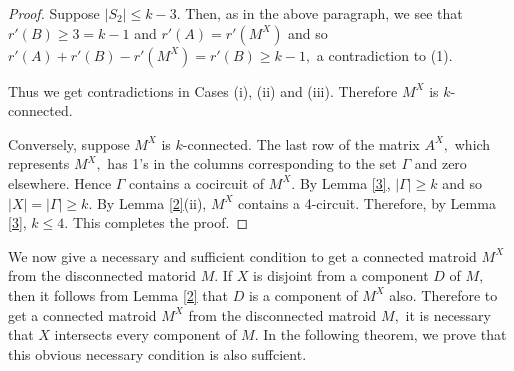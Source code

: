 \documentclass[
11pt,%
tightenlines,%
twoside,%
onecolumn,%
nofloats,%
nobibnotes,%
nofootinbib,%
superscriptaddress,%
noshowpacs,%
centertags]%
{revtex4}
\begin{document}
\begin{proof}
Suppose $|S_2| \leq k-3.$ Then, as in the above paragraph, we  see
that $r'(B) \geq 3=k-1$ and $ r'(A) = r'(M^X)$ and  so $
r'(A)+r'(B)-r'(M^{X}) = r'(B) \geq k-1,$ a contradiction to (1).

Thus we get contradictions in Cases (i), (ii) and (iii).  Therefore
$M^{X}$ is $k$-connected.

Conversely, suppose $M^{X}$ is $k$-connected.  The last  row of the
matrix $A^X,$ which represents $M^X,$ has 1's in the columns
corresponding to the set $\Gamma$ and zero elsewhere.  Hence
$\Gamma$ contains a cocircuit of $M^X.$  By Lemma \ref{3},
$|\Gamma| \geq k$ and so  $|X| = |\Gamma| \geq k.$ By Lemma
\ref{2}(ii), $M^X$ contains a 4-circuit. Therefore, by Lemma
\ref{3}, $k\leq 4.$  This completes the proof.
\end{proof}

We now give a necessary and sufficient condition to get a connected
matroid $M^X$ from the disconnected matorid $M.$  If  $X$ is
disjoint from a component $D$ of $M,$ then  it follows from Lemma
\ref{2}  that $D$ is a component of $M^X$ also.  Therefore to get a
connected matroid $M^X$ from the disconnected matroid $M,$  it is
necessary that $X$ intersects  every component of $M.$  In  the
following theorem,  we prove that this obvious necessary condition
is also suffcient.
\end{document}
